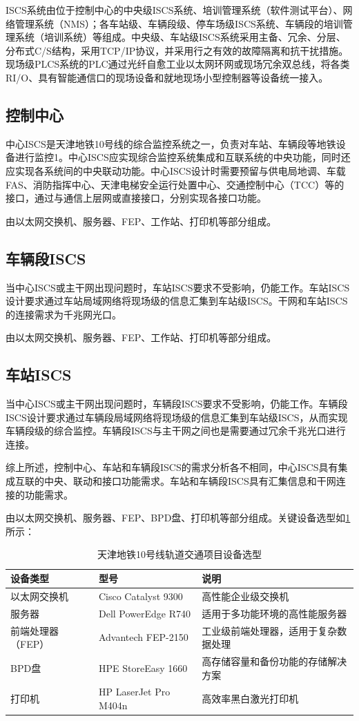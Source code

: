 ISCS系统由位于控制中心的中央级ISCS系统、培训管理系统（软件测试平台）、网络管理系统（NMS）；各车站级、车辆段级、停车场级ISCS系统、车辆段的培训管理系统（培训系统）等组成。中央级、车站级ISCS系统采用主备、冗余、分层、分布式C/S结构，采用TCP/IP协议，并采用行之有效的故障隔离和抗干扰措施。现场级PLCS系统的PLC通过光纤自愈工业以太网环网或现场冗余双总线，将各类RI/O、具有智能通信口的现场设备和就地现场小型控制器等设备统一接入。

\subsection{控制中心}
中心ISCS是天津地铁10号线的综合监控系统之一，负责对车站、车辆段等地铁设备进行监控1。中心ISCS应实现综合监控系统集成和互联系统的中央功能，同时还应实现各系统间的中央联动功能。中心ISCS设计时需要预留与供电局地调、车载FAS、消防指挥中心、天津电梯安全运行处置中心、交通控制中心（TCC）等的接口，通过与通信上层网或直接接口，分别实现各接口功能。

由以太网交换机、服务器、FEP、工作站、打印机等部分组成。

\subsection{车辆段ISCS}
当中心ISCS或主干网出现问题时，车站ISCS要求不受影响，仍能工作。车站ISCS设计要求通过车站局域网络将现场级的信息汇集到车站级ISCS。干网和车站ISCS的连接需求为千兆网光口。

由以太网交换机、服务器、FEP、工作站、打印机等部分组成。

\subsection{车站ISCS}
当中心ISCS或主干网出现问题时，车辆段ISCS要求不受影响，仍能工作。车辆段ISCS设计要求通过车辆段局域网络将现场级的信息汇集到车站级ISCS，从而实现车辆段级的综合监控。车辆段ISCS与主干网之间也是需要通过冗余千兆光口进行连接。

综上所述，控制中心、车站和车辆段ISCS的需求分析各不相同，中心ISCS具有集成互联的中央、联动和接口功能需求。车站和车辆段ISCS具有汇集信息和干网连接的功能需求。

由以太网交换机、服务器、FEP、BPD盘、打印机等部分组成。关键设备选型如\ref{table:设备选型}所示：
\begin{table}[h]
	\centering
	\caption{天津地铁10号线轨道交通项目设备选型}
	\label{table:设备选型}
	\begin{tabular}{|l|l|l|}
		\hline
		\textbf{设备类型} & \textbf{型号} & \textbf{说明} \\ \hline
		以太网交换机 & Cisco Catalyst 9300 & 高性能企业级交换机 \\ \hline
		服务器 & Dell PowerEdge R740 & 适用于多功能环境的高性能服务器 \\ \hline
		前端处理器（FEP） & Advantech FEP-2150 & 工业级前端处理器，适用于复杂数据处理 \\ \hline
		BPD盘 & HPE StoreEasy 1660 & 高存储容量和备份功能的存储解决方案 \\ \hline
		打印机 & HP LaserJet Pro M404n & 高效率黑白激光打印机 \\ \hline
	\end{tabular}
\end{table}

